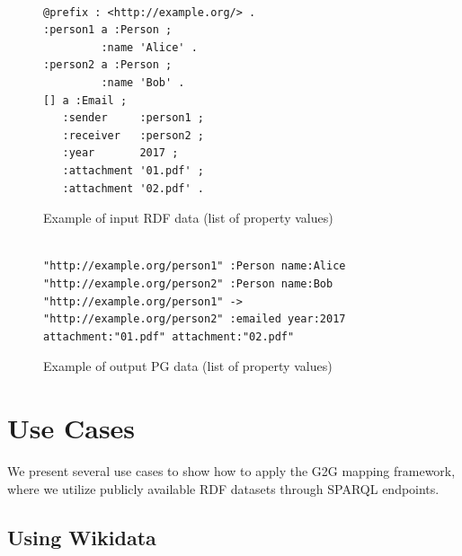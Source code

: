 \documentclass[runningheads]{llncs}
\begin{document}
\begin{figure}[!t]
\begin{scriptsize}
\begin{verbatim}

@prefix : <http://example.org/> .
:person1 a :Person ;
         :name 'Alice' .
:person2 a :Person ;
         :name 'Bob' .
[] a :Email ;
   :sender     :person1 ;
   :receiver   :person2 ;
   :year       2017 ;
   :attachment '01.pdf' ;
   :attachment '02.pdf' .

\end{verbatim}
\end{scriptsize}
\caption{Example of input RDF data (list of property values)}
\label{fig:example-rdf3}
\end{figure}


\begin{figure}[!t]
\begin{scriptsize}
\begin{verbatim}

"http://example.org/person1" :Person name:Alice
"http://example.org/person2" :Person name:Bob
"http://example.org/person1" -> "http://example.org/person2" :emailed year:2017 attachment:"01.pdf" attachment:"02.pdf"

\end{verbatim}
\end{scriptsize}
\caption{Example of output PG data (list of property values)}
\label{fig:example-pg3}
\end{figure}



\section{Use Cases}
 
We present several use cases to show how to apply the G2G mapping framework, where we utilize publicly available RDF datasets through SPARQL endpoints.

 
\subsection{Using Wikidata}
 
\end{document}

